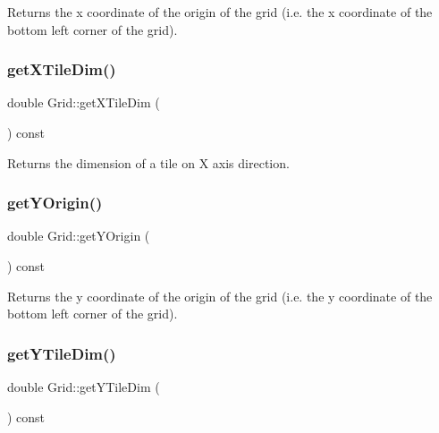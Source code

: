 \begin{DoxyReturn}{Returns}
the x coordinate of the origin of the grid (i.\+e. the x coordinate of the bottom left corner of the grid). 
\end{DoxyReturn}
\mbox{\label{class_grid_a1c5b9ad91fac264bcdd67f99bc93f663}} 
\subsubsection{\texorpdfstring{get\+X\+Tile\+Dim()}{getXTileDim()}}
{\footnotesize\ttfamily double Grid\+::get\+X\+Tile\+Dim (\begin{DoxyParamCaption}{ }\end{DoxyParamCaption}) const}

\begin{DoxyReturn}{Returns}
the dimension of a tile on X axis direction. 
\end{DoxyReturn}
\mbox{\label{class_grid_a53141770920cf261579cf164a8909af9}} 
\subsubsection{\texorpdfstring{get\+Y\+Origin()}{getYOrigin()}}
{\footnotesize\ttfamily double Grid\+::get\+Y\+Origin (\begin{DoxyParamCaption}{ }\end{DoxyParamCaption}) const}

\begin{DoxyReturn}{Returns}
the y coordinate of the origin of the grid (i.\+e. the y coordinate of the bottom left corner of the grid). 
\end{DoxyReturn}
\mbox{\label{class_grid_aedfe477f5be79a375bd64a4d21765918}} 
\subsubsection{\texorpdfstring{get\+Y\+Tile\+Dim()}{getYTileDim()}}
{\footnotesize\ttfamily double Grid\+::get\+Y\+Tile\+Dim (\begin{DoxyParamCaption}{ }\end{DoxyParamCaption}) const}

